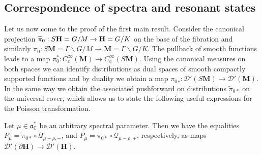 \documentclass[AHL, Unicode, longabstracts, published]{cedram}
\newcommand{\cc}{\mathbb{C}}
\newcommand{\bfh}{\mathbf{H}}
\newcommand{\bfm}{\mathbf{M}}
\newcommand{\pl}{\partial}
\newcommand{\til}{\widetilde}
\renewcommand{\a}{\mathfrak a}
\begin{document}
\subsection{Correspondence of spectra and resonant states}

Let us now come to the proof of the first main result. Consider the canonical projection $\til{\pi}_0: S{\bfh}= G/M\to {\bf H}=G/K$ on the base of the fibration and similarly $\pi_0: S{\bfm}=\Gamma\backslash G/M\to {\bfm}=\Gamma\backslash G/K$. The pullback of smooth functions leads to a map $\pi_0^*: C_c^\infty({\bfm}) \to C_c^\infty(S{\bfm})$. Using the canonical measures on both spaces we can identify distributions as dual spaces of smooth compactly supported functions and by duality we obtain a map ${\pi_0}_*: \mathcal D'(S{\bfm}) \to \mathcal D'({\bfm})$. In the same way we obtain the associated pushforward on distributions $\til \pi_{0*}$ on the universal cover, which allows us to state the following useful expressions for the Poisson transformation.

\begin{prop}\label{prop:poisson_projection}
Let $\mu\in \a^*_\cc$ be an arbitrary spectral parameter. Then we have the equalities $P_\mu = \til{\pi}_{0*} \circ \mathcal Q_{\mu-\rho, -}$, and $P_\mu = \til{\pi}_{0*} \circ \mathcal Q_{\mu-\rho, +}$, respectively, as maps $\mathcal D'(\pl {\bfh}) \to \mathcal D'({\bfh})$.
\end{prop}
\end{document}

